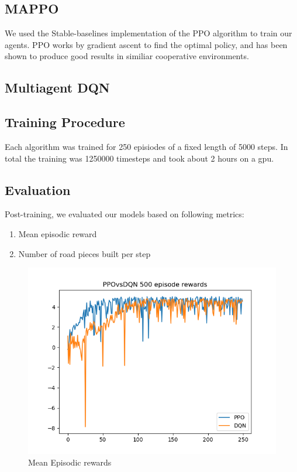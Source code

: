 \documentclass[conference]{IEEEtran}
\begin{document}
	\subsection{MAPPO}
	We used the Stable-baselines implementation of the PPO algorithm to train our agents.
	PPO works by gradient ascent to find the optimal policy, and has been shown to produce good results in similiar cooperative environments. %


	\subsection{Multiagent DQN}

	\subsection{Training Procedure}
	Each algorithm was trained for 250 episiodes of a fixed length of 5000 steps. In total the training was 1250000 timesteps and took about 2 hours on a gpu.

	\subsection{Evaluation}
	Post-training, we evaluated our models based on following metrics:
	\begin{enumerate}
		\item Mean episodic reward
		\item Number of road pieces built per step
	\end{enumerate}

	\begin{figure}[h!]
		\includegraphics[width=\columnwidth]{graphs/PPOvsDQN250.png}
		\caption{Mean Episodic rewards}
	\end{figure}
\end{document}
